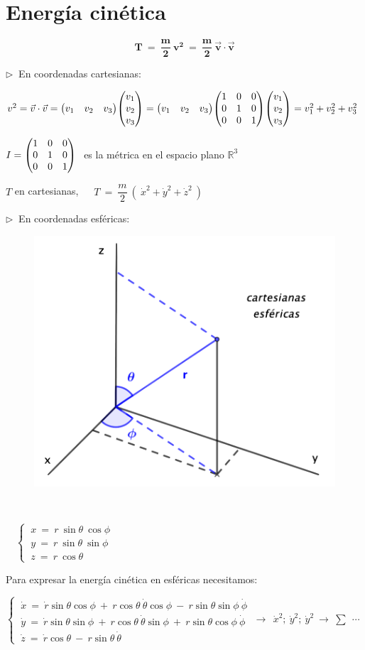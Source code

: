 \vspace{5mm}
\section{Energía cinética}
\label{T12Tesfericas}

$$\boldsymbol {T \ = \ \dfrac m 2 \ v^2 \ = \ \dfrac m 2 \ \vec v \cdot \vec v }$$


$\triangleright \ $ En coordenadas cartesianas:

$v^2=\vec v \cdot \vec v= \mqty(v_1&v_2&v_3) \mqty(v_1\\v_2\\v_3)=\mqty(v_1&v_2&v_3) \mqty(\imat{3}) \mqty(v_1\\v_2\\v_3)=
v_1^2+v_2^2+v_3^2$

\begin{scriptsize} \textcolor{gris}{$I=\mqty(\imat{3}) \ $ es la métrica en el espacio plano $\mathbb R^3$} \end{scriptsize}


$T$ en cartesianas, $\quad  \boxed{ \ T \ = \ \dfrac m 2 \ ( \ \dot x^2 + \dot y^2 + \dot z^2 \ ) \ }$

$\triangleright \ $ En coordenadas esféricas:

\begin{multicols}{2}
	\begin{figure}[H]
	\centering
	\includegraphics[width=.3\textwidth]{imagenes/img12-01.png}
\end{figure}
$\quad$

$\quad \begin{cases}
\ x \ = \ r\ \sin \theta \ \cos \phi \\
\ y \ = \ r\ \sin \theta \ \sin \phi \\
\ z \ = \ r\ \cos \theta  	
\end{cases}$

\end{multicols}

Para expresar la energía cinética en esféricas necesitamos:

$\begin{cases}
\ \dot x \ = \	\dot r \sin \theta \cos \phi \ + \ r \cos \theta \ \dot \theta \cos \phi \ - \  r \sin \theta \sin \phi \ \dot \phi \\
\ \dot y \ = \	\dot r \sin \theta \sin \phi \ + \ r \cos \theta \ \dot \theta \sin \phi \ + \  r \sin \theta \cos \phi \ \dot \phi \\
\ \dot z \ = \ \dot r \cos \theta \ - \ r \sin \theta \ \dot \theta
\end{cases} \ \to \ \ \dot x^2; \ \dot y^2;\ \dot y^2 \ \to \ \sum \ \ \cdots$

